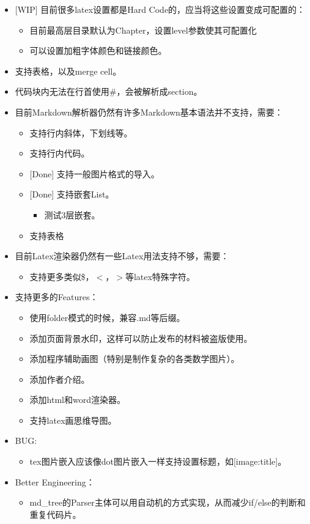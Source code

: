 \documentclass[export, 12pt, letterpaper]{ctexrep}
\begin{document}
\begin{itemize}
\item{ [WIP] 目前很多latex设置都是Hard Code的，应当将这些设置变成可配置的：
\begin{itemize}
\item{ 目前最高层目录默认为Chapter，设置level参数使其可配置化 }
\item{ 可以设置加粗字体颜色和链接颜色。 }
\end{itemize}
 }
\item{ 支持表格，以及merge cell。 }
\item{ 代码块内无法在行首使用\#，会被解析成section。 }
\item{ 目前Markdown解析器仍然有许多Markdown基本语法并不支持，需要：
\begin{itemize}
\item{ 支持行内斜体，下划线等。 }
\item{ 支持行内代码。 }
\item{ [Done] 支持一般图片格式的导入。 }
\item{ [Done] 支持嵌套List。
\begin{itemize}
\item{ 测试3层嵌套。 }
\end{itemize}
 }
\item{ 支持表格 }
\end{itemize}
 }
\item{ 目前Latex渲染器仍然有一些Latex用法支持不够，需要：
\begin{itemize}
\item{ 支持更多类似\$，$<$，$>$等latex特殊字符。 }
\end{itemize}
 }
\item{ 支持更多的Features：
\begin{itemize}
\item{ 使用folder模式的时候，兼容.md等后缀。 }
\item{ 添加页面背景水印，这样可以防止发布的材料被盗版使用。 }
\item{ 添加程序辅助画图（特别是制作复杂的各类数学图片）。 }
\item{ 添加作者介绍。 }
\item{ 添加html和word渲染器。 }
\item{ 支持latex画思维导图。 }
\end{itemize}
 }
\item{ BUG:
\begin{itemize}
\item{ tex图片嵌入应该像dot图片嵌入一样支持设置标题，如[image:title]。 }
\end{itemize}
 }
\item{ Better Engineering：
\begin{itemize}
\item{ md\_tree的Parser主体可以用自动机的方式实现，从而减少if/else的判断和重复代码片。 }
\end{itemize}
 }
\end{itemize}
\end{document}
